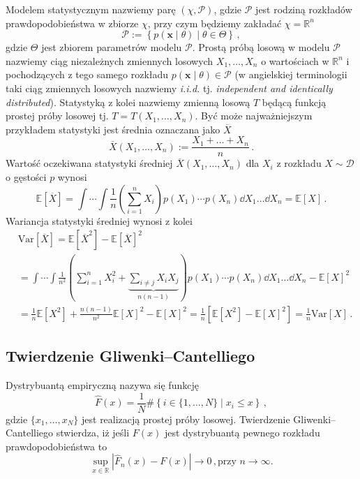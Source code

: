 \documentclass{myclass}
\begin{document}
Modelem statystycznym nazwiemy parę \((\chi, \mathcal{P})\), gdzie \(\mathcal{P}\) jest rodziną
rozkładów prawdopodobieństwa w zbiorze \(\chi\), przy czym będziemy zakładać \(\chi = \mathbb{R}^n\)
\begin{equation*}
    \mathcal{P} := \left\{p(\mathbf{x} \mid \theta) \mid \theta \in \Theta \right\}\,,
\end{equation*}
gdzie \(\Theta\) jest zbiorem parametrów modelu \(\mathcal{P}\). Prostą próbą losową w modelu
\(\mathcal{P}\) nazwiemy ciąg niezależnych zmiennych losowych \(X_1, \ldots, X_n\) o wartościach w
\(\mathbb{R}^n\) i pochodzących z tego samego rozkładu \(p(\mathbf{x} \mid \theta) \in \mathcal{P}\)
(w angielskiej terminologii taki ciąg zmiennych losowych nazwiemy \textit{i.i.d.} tj.
\textit{independent and identically distributed}). Statystyką z kolei nazwiemy zmienną losową \(T\)
będącą funkcją prostej próby losowej tj. \(T = T(X_1, \ldots, X_n)\). Być może najważniejszym
przykładem statystyki jest średnia oznaczana jako \(\overline{X}\)
\begin{equation*}
    \overline{X}(X_1, \ldots, X_n) := \frac{X_1 + \ldots + X_n}{n}\,.
\end{equation*}
Wartość oczekiwana statystyki średniej \(\overline{X}(X_1, \ldots, X_n)\) dla \(X_i\) z rozkładu \(X
\sim \mathcal{D}\) o gęstości \(p\) wynosi
\begin{equation*}
    \mathbb{E}[\overline{X}] = \int\cdots\int\frac{1}{n}\left(\sum_{i=1}^nX_i\right)p(X_1)\cdots p(X_n) \dd{X_1}\ldots\dd{X_n} = \mathbb{E}[X]\,.
\end{equation*}
Wariancja statystyki średniej wynosi z kolei
\begin{equation*}
    \begin{split}
        &\text{Var}[\overline{X}] = \mathbb{E}[\overline{X}^2] - \mathbb{E}[\overline{X}]^2 \\
        &= \int\cdots\int\frac{1}{n^2}\left(\sum_{i=1}^n X_i^2 + \underbrace{\sum_{i\neq j}X_iX_j}_{n(n-1)}\right) p(X_1)\cdots p(X_n)\dd{X_1}\ldots\dd{X_n} - \mathbb{E}[X]^2\\
        &= \frac{1}{n}\mathbb{E}[X^2] + \frac{n(n-1)}{n^2}\mathbb{E}[X]^2 - \mathbb{E}[X]^2 = \frac{1}{n}\left[\mathbb{E}[X^2] - \mathbb{E}[X]^2\right] = \frac{1}{n}\text{Var}[X]\,.
    \end{split}
\end{equation*}

\subsection{Twierdzenie Gliwenki--Cantelliego}
Dystrybuantą empiryczną nazywa się funkcję
\begin{equation*}
    \hat{F}(x) = \frac{1}{N}\#\left\{i \in \{1,\ldots,N\} \mid x_i \leq x \right\}\,,
\end{equation*}
gdzie \(\{x_1,\ldots,x_N\}\) jest realizacją prostej próby losowej. Twierdzenie
Gliwenki--Cantelliego stwierdza, iż jeśli \(F(x)\) jest dystrybuantą pewnego rozkładu
prawdopodobieństwa to
\begin{equation*}
    \sup_{x\in\mathbb{R}} |\hat{F}_n(x) - F(x)| \to 0\,,\text{przy \(n\to\infty\).}
\end{equation*}
\end{document}
